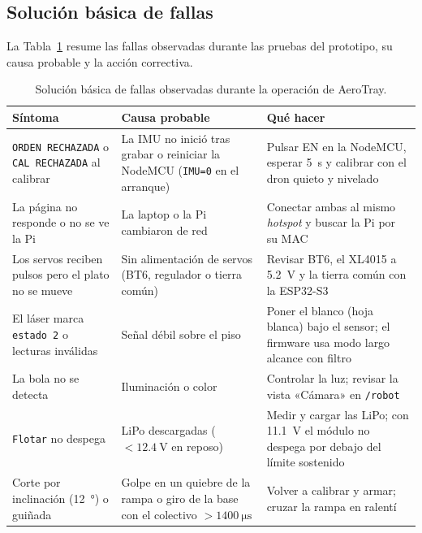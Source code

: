 \subsection{Solución básica de fallas}
\label{sec:troubleshooting}
La Tabla~\ref{tab:troubleshooting} resume las fallas observadas durante las pruebas del prototipo, su causa probable y la acción correctiva.

\begin{table}[!htbp]
\centering
\caption{Solución básica de fallas observadas durante la operación de AeroTray.}
\label{tab:troubleshooting}
\footnotesize
\begin{tabularx}{\textwidth}{@{}>{\raggedright\arraybackslash}p{}>{\raggedright\arraybackslash}p{}>{\raggedright\arraybackslash}X@{}}
\toprule
Síntoma & Causa probable & Qué hacer \\
\midrule
\texttt{ORDEN RECHAZADA} o \texttt{CAL RECHAZADA} al calibrar & La IMU no inició tras grabar o reiniciar la NodeMCU (\texttt{IMU=0} en el arranque) & Pulsar EN en la NodeMCU, esperar \SI{5}{\second} y calibrar con el dron quieto y nivelado \\
La página no responde o no se ve la Pi & La laptop o la Pi cambiaron de red & Conectar ambas al mismo \emph{hotspot} y buscar la Pi por su MAC \\
Los servos reciben pulsos pero el plato no se mueve & Sin alimentación de servos (BT6, regulador o tierra común) & Revisar BT6, el XL4015 a \SI{5.2}{\volt} y la tierra común con la ESP32-S3 \\
El láser marca \texttt{estado 2} o lecturas inválidas & Señal débil sobre el piso & Poner el blanco (hoja blanca) bajo el sensor; el firmware usa modo largo alcance con filtro \\
La bola no se detecta & Iluminación o color & Controlar la luz; revisar la vista «Cámara» en \texttt{/robot} \\
\texttt{Flotar} no despega & LiPo descargadas ($<\SI{12.4}{\volt}$ en reposo) & Medir y cargar las LiPo; con \SI{11.1}{\volt} el módulo no despega por debajo del límite sostenido \\
Corte por inclinación (\SI{12}{\degree}) o guiñada & Golpe en un quiebre de la rampa o giro de la base con el colectivo $>\SI{1400}{\micro\second}$ & Volver a calibrar y armar; cruzar la rampa en ralentí \\
\bottomrule
\end{tabularx}
\end{table}

